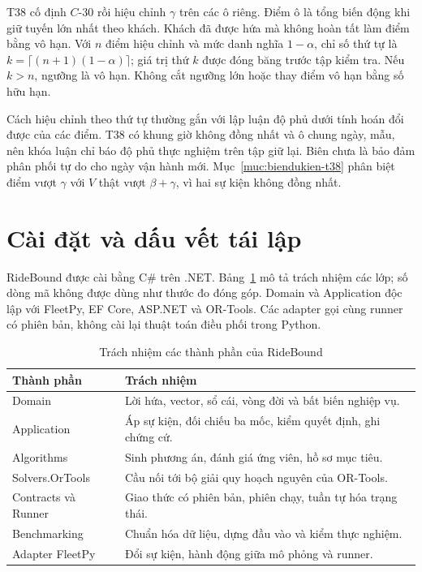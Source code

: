 T38 cố định $C$-30 rồi hiệu chỉnh $\gamma$ trên các ô riêng. Điểm ô là tổng biến động khi
giữ tuyến lớn nhất theo khách. Khách đã được hứa mà không hoàn tất làm điểm bằng vô hạn.
Với $n$ điểm hiệu chỉnh và mức danh nghĩa $1-\alpha$, chỉ số thứ tự là
$k=\lceil(n+1)(1-\alpha)\rceil$; giá trị thứ $k$ được đóng băng trước tập kiểm tra. Nếu
$k>n$, ngưỡng là vô hạn. Không cắt ngưỡng lớn hoặc thay điểm vô hạn bằng số hữu hạn.

Cách hiệu chỉnh theo thứ tự thường gắn với lập luận độ phủ dưới tính hoán đổi được của các
điểm. T38 có khung giờ không đồng nhất và ô chung ngày, mẫu, nên khóa luận chỉ báo độ phủ
thực nghiệm trên tập giữ lại. Biên chưa là bảo đảm phân phối tự do cho ngày vận hành mới.
Mục~\ref{muc:biendukien-t38} phân biệt điểm vượt $\gamma$ với $V$ thật vượt $\beta+\gamma$, vì hai
sự kiện không đồng nhất.

\section{Cài đặt và dấu vết tái lập}


RideBound được cài bằng C\# trên .NET. Bảng~\ref{bang:kientruc} mô tả trách nhiệm các lớp;
số dòng mã không được dùng như thước đo đóng góp. Domain và Application độc lập với
FleetPy, EF Core, ASP.NET và OR-Tools. Các adapter gọi cùng runner có phiên bản, không
cài lại thuật toán điều phối trong Python.

\begin{table}[htbp]
\centering
\caption{Trách nhiệm các thành phần của RideBound}
\label{bang:kientruc}
\begin{tabularx}{\linewidth}{@{}lX@{}}
\toprule
\textbf{Thành phần} & \textbf{Trách nhiệm}\\
\midrule
Domain & Lời hứa, vector, sổ cái, vòng đời và bất biến nghiệp vụ.\\
Application & Áp sự kiện, đối chiếu ba mốc, kiểm quyết định, ghi chứng cứ.\\
Algorithms & Sinh phương án, đánh giá ứng viên, hồ sơ mục tiêu.\\
Solvers.OrTools & Cầu nối tới bộ giải quy hoạch nguyên của OR-Tools.\\
Contracts và Runner & Giao thức có phiên bản, phiên chạy, tuần tự hóa trạng thái.\\
Benchmarking & Chuẩn hóa dữ liệu, dựng đầu vào và kiểm thực nghiệm.\\
Adapter FleetPy & Đổi sự kiện, hành động giữa mô phỏng và runner.\\
\bottomrule
\end{tabularx}
\end{table}

